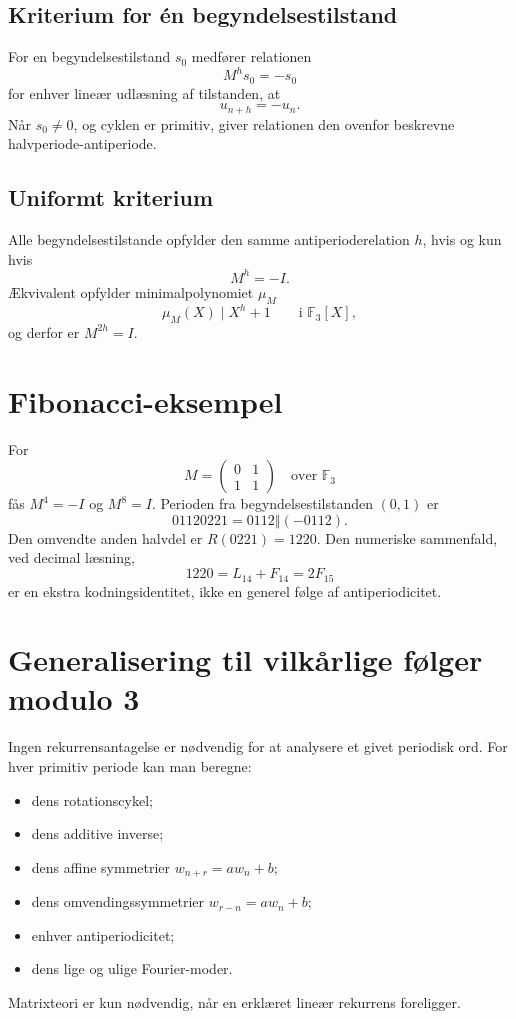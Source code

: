\documentclass[11pt,a4paper]{article}
\newcommand{\F}{\mathbb{F}}
\newcommand{\oplusword}{\mathbin{\Vert}}
\begin{document}
\subsection{Kriterium for én begyndelsestilstand}
For en begyndelsestilstand $s_0$ medfører relationen
\[
M^hs_0=-s_0
\]
for enhver lineær udlæsning af tilstanden, at
\[
u_{n+h}=-u_n.
\]
Når $s_0\neq0$, og cyklen er primitiv, giver relationen den ovenfor beskrevne halvperiode-antiperiode.

\clearpage
\subsection{Uniformt kriterium}
Alle begyndelsestilstande opfylder den samme antiperioderelation $h$, hvis og kun hvis
\[
M^h=-I.
\]
Ækvivalent opfylder minimalpolynomiet $\mu_M$
\[
\mu_M(X)\mid X^h+1\qquad\text{i }\F_3[X],
\]
og derfor er $M^{2h}=I$.

\section{Fibonacci-eksempel}
For
\[
M=\begin{pmatrix}0&1\\1&1\end{pmatrix}\quad\text{over }\F_3
\]
fås $M^4=-I$ og $M^8=I$. Perioden fra begyndelsestilstanden $(0,1)$ er
\[
01120221=0112\oplusword(-0112).
\]
Den omvendte anden halvdel er $R(0221)=1220$. Den numeriske sammenfald, ved decimal læsning,
\[
1220=L_{14}+F_{14}=2F_{15}
\]
er en ekstra kodningsidentitet, ikke en generel følge af antiperiodicitet.

\section{Generalisering til vilkårlige følger modulo 3}
Ingen rekurrensantagelse er nødvendig for at analysere et givet periodisk ord. For hver primitiv periode kan man beregne:
\begin{itemize}
\item dens rotationscykel;
\item dens additive inverse;
\item dens affine symmetrier $w_{n+r}=aw_n+b$;
\item dens omvendingssymmetrier $w_{r-n}=aw_n+b$;
\item enhver antiperiodicitet;
\item dens lige og ulige Fourier-moder.
\end{itemize}
Matrixteori er kun nødvendig, når en erklæret lineær rekurrens foreligger.
\end{document}
